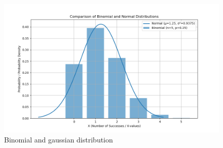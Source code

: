 \documentclass[journal,11pt,onecolumn]{IEEEtran}
\begin{document}
\begin{figure}[ht!]
	\centering
	\includegraphics[width=\columnwidth]{figs/fig.png}
	\caption{Binomial and gaussian distribution}
\end{figure}
\end{document}

